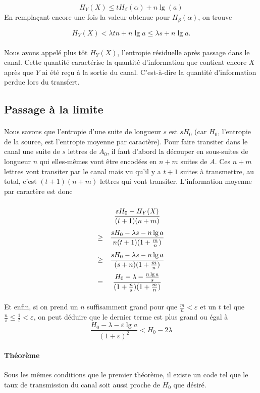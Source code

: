 	\[H_Y(X)\le t H_\beta(\alpha) + n \lg(a)\]
	En remplaçant encore une fois la valeur obtenue pour $H_\beta(\alpha)$, 
	on trouve
	
	\[H_Y(X)<\lambda t n + n \lg a \le \lambda s+n \lg a.\]
	
	\paragraph{}
	Nous avons appelé plus tôt $H_Y(X)$, l'entropie résiduelle 
	après passage dans le canal. Cette quantité caractérise la quantité 
	d'information que contient encore $X$ après que $Y$ ai été reçu à la 
	sortie du canal. C'est-à-dire la quantité d'information perdue lors 
	du transfert.
	
\subsection*{Passage à la limite}
	
	\paragraph{}
	Nous savons que l'entropie d'une suite de longueur $s$ est $sH_0$ 
	(car $H_0$, l'entropie de la source, est l'entropie moyenne par caractère). 
	Pour faire transiter dans le canal une suite de $s$ lettres de $A_0$,
	il faut d'abord la découper en sous-suites de longueur $n$ qui 
	elles-mêmes vont être encodées en $n+m$ suites de $A$. Ces $n+m$ lettres
	vont transiter par le canal mais vu qu'il y a $t+1$ suites à 
	transmettre, au total, c'est $(t+1)(n+m)$ lettres qui vont transiter. 
	L'information moyenne par caractère est donc
	
	\[
		\def\arraystretch{2.5}
		\begin{array}{c>{\displaystyle}c}
		&\frac{sH_0-H_Y(X)}{(t+1)(n+m)}\\
		\ge&\frac{sH_0-\lambda s-n\lg a}{n(t+1)(1+\frac{m}{n})}\\
		\ge&\frac{sH_0-\lambda s-n\lg a}{(s+n)(1+\frac{m}{n})}\\
		=&\frac{H_0-\lambda-\frac{n\lg a}{s}}{(1+\frac{n}{s})(1+\frac{m}{n})}\\
		\end{array}
	\]
	
	\paragraph{}
	Et enfin, si on prend un $n$ suffisamment grand pour que 
	$\frac{m}{n}<\varepsilon$ et un $t$ tel que
	$\frac{n}{s} \le \frac{1}{t} < \varepsilon$, on peut 
	déduire que le dernier terme est plus grand ou égal à
	\[\frac{H_0-\lambda-\varepsilon\lg a}{(1+\varepsilon)^2}<H_0-2\lambda\]
	
	
	
	
	
	
	
	
	\paragraph{Théorème}
	Sous les mêmes conditions que le premier théorème, il existe un code tel
	que le taux de transmission du canal soit aussi proche de $H_0$ que désiré.

